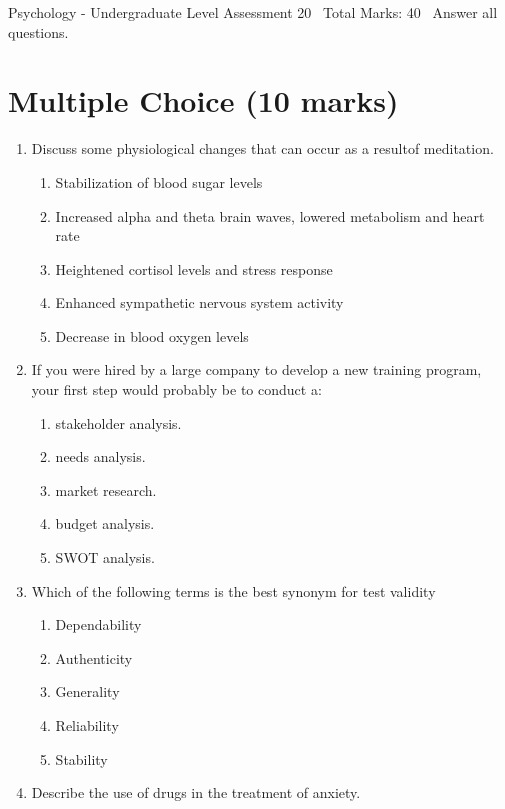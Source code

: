 \documentclass[12pt]{article}
\begin{document}
\begin{center}
Psychology - Undergraduate Level Assessment 20 \
Total Marks: 40 \
Answer all questions.
\end{center}

\section*{Multiple Choice (10 marks)}
\begin{enumerate}[label=\arabic*.]
\item Discuss some physiological changes that can occur as a resultof meditation.
\begin{enumerate}[label=(\alph*)]
    \item Stabilization of blood sugar levels
    \item Increased alpha and theta brain waves, lowered metabolism and heart rate
    \item Heightened cortisol levels and stress response
    \item Enhanced sympathetic nervous system activity
    \item Decrease in blood oxygen levels
\end{enumerate}
\item If you were hired by a large company to develop a new training program, your first step would probably be to conduct a:
\begin{enumerate}[label=(\alph*)]
    \item stakeholder analysis.
    \item needs analysis.
    \item market research.
    \item budget analysis.
    \item SWOT analysis.
\end{enumerate}
\item Which of the following terms is the best synonym for test validity
\begin{enumerate}[label=(\alph*)]
    \item Dependability
    \item Authenticity
    \item Generality
    \item Reliability
    \item Stability
\end{enumerate}
\item Describe the use of drugs in the treatment of anxiety.
\begin{enumerate}[label=(\alph*)]

\end{enumerate}
\end{enumerate}
\end{document}
